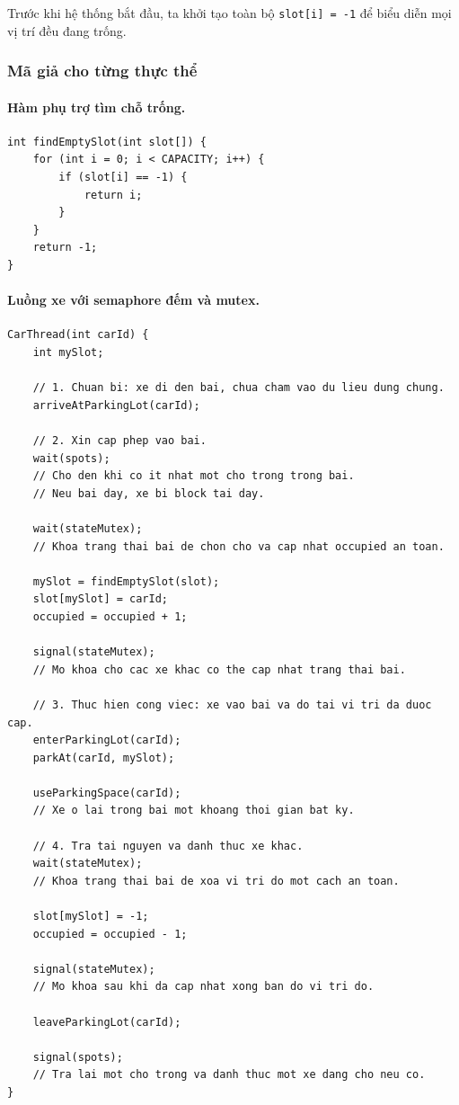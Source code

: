 Trước khi hệ thống bắt đầu, ta khởi tạo toàn bộ \texttt{slot[i] = -1} để
biểu diễn mọi vị trí đều đang trống.

\subsubsection*{Mã giả cho từng thực thể}

\paragraph{Hàm phụ trợ tìm chỗ trống.}

\begin{lstlisting}
int findEmptySlot(int slot[]) {
    for (int i = 0; i < CAPACITY; i++) {
        if (slot[i] == -1) {
            return i;
        }
    }
    return -1;
}
\end{lstlisting}

\paragraph{Luồng xe với semaphore đếm và mutex.}

\begin{lstlisting}
CarThread(int carId) {
    int mySlot;

    // 1. Chuan bi: xe di den bai, chua cham vao du lieu dung chung.
    arriveAtParkingLot(carId);

    // 2. Xin cap phep vao bai.
    wait(spots);
    // Cho den khi co it nhat mot cho trong trong bai.
    // Neu bai day, xe bi block tai day.

    wait(stateMutex);
    // Khoa trang thai bai de chon cho va cap nhat occupied an toan.

    mySlot = findEmptySlot(slot);
    slot[mySlot] = carId;
    occupied = occupied + 1;

    signal(stateMutex);
    // Mo khoa cho cac xe khac co the cap nhat trang thai bai.

    // 3. Thuc hien cong viec: xe vao bai va do tai vi tri da duoc cap.
    enterParkingLot(carId);
    parkAt(carId, mySlot);

    useParkingSpace(carId);
    // Xe o lai trong bai mot khoang thoi gian bat ky.

    // 4. Tra tai nguyen va danh thuc xe khac.
    wait(stateMutex);
    // Khoa trang thai bai de xoa vi tri do mot cach an toan.

    slot[mySlot] = -1;
    occupied = occupied - 1;

    signal(stateMutex);
    // Mo khoa sau khi da cap nhat xong ban do vi tri do.

    leaveParkingLot(carId);

    signal(spots);
    // Tra lai mot cho trong va danh thuc mot xe dang cho neu co.
}
\end{lstlisting}

